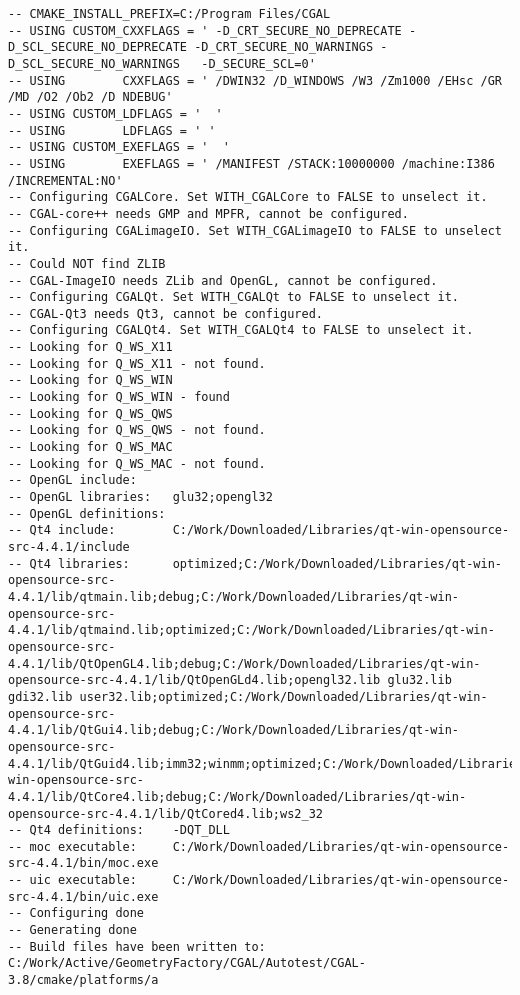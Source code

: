 {\begin{verbatim}
-- CMAKE_INSTALL_PREFIX=C:/Program Files/CGAL
-- USING CUSTOM_CXXFLAGS = ' -D_CRT_SECURE_NO_DEPRECATE -D_SCL_SECURE_NO_DEPRECATE -D_CRT_SECURE_NO_WARNINGS -D_SCL_SECURE_NO_WARNINGS   -D_SECURE_SCL=0'
-- USING        CXXFLAGS = ' /DWIN32 /D_WINDOWS /W3 /Zm1000 /EHsc /GR /MD /O2 /Ob2 /D NDEBUG'
-- USING CUSTOM_LDFLAGS = '  '
-- USING        LDFLAGS = ' '
-- USING CUSTOM_EXEFLAGS = '  '
-- USING        EXEFLAGS = ' /MANIFEST /STACK:10000000 /machine:I386 /INCREMENTAL:NO'
-- Configuring CGALCore. Set WITH_CGALCore to FALSE to unselect it.
-- CGAL-core++ needs GMP and MPFR, cannot be configured.
-- Configuring CGALimageIO. Set WITH_CGALimageIO to FALSE to unselect it.
-- Could NOT find ZLIB
-- CGAL-ImageIO needs ZLib and OpenGL, cannot be configured.
-- Configuring CGALQt. Set WITH_CGALQt to FALSE to unselect it.
-- CGAL-Qt3 needs Qt3, cannot be configured.
-- Configuring CGALQt4. Set WITH_CGALQt4 to FALSE to unselect it.
-- Looking for Q_WS_X11
-- Looking for Q_WS_X11 - not found.
-- Looking for Q_WS_WIN
-- Looking for Q_WS_WIN - found
-- Looking for Q_WS_QWS
-- Looking for Q_WS_QWS - not found.
-- Looking for Q_WS_MAC
-- Looking for Q_WS_MAC - not found.
-- OpenGL include:     
-- OpenGL libraries:   glu32;opengl32
-- OpenGL definitions: 
-- Qt4 include:        C:/Work/Downloaded/Libraries/qt-win-opensource-src-4.4.1/include
-- Qt4 libraries:      optimized;C:/Work/Downloaded/Libraries/qt-win-opensource-src-4.4.1/lib/qtmain.lib;debug;C:/Work/Downloaded/Libraries/qt-win-opensource-src-4.4.1/lib/qtmaind.lib;optimized;C:/Work/Downloaded/Libraries/qt-win-opensource-src-4.4.1/lib/QtOpenGL4.lib;debug;C:/Work/Downloaded/Libraries/qt-win-opensource-src-4.4.1/lib/QtOpenGLd4.lib;opengl32.lib glu32.lib gdi32.lib user32.lib;optimized;C:/Work/Downloaded/Libraries/qt-win-opensource-src-4.4.1/lib/QtGui4.lib;debug;C:/Work/Downloaded/Libraries/qt-win-opensource-src-4.4.1/lib/QtGuid4.lib;imm32;winmm;optimized;C:/Work/Downloaded/Libraries/qt-win-opensource-src-4.4.1/lib/QtCore4.lib;debug;C:/Work/Downloaded/Libraries/qt-win-opensource-src-4.4.1/lib/QtCored4.lib;ws2_32
-- Qt4 definitions:    -DQT_DLL
-- moc executable:     C:/Work/Downloaded/Libraries/qt-win-opensource-src-4.4.1/bin/moc.exe
-- uic executable:     C:/Work/Downloaded/Libraries/qt-win-opensource-src-4.4.1/bin/uic.exe
-- Configuring done
-- Generating done
-- Build files have been written to: C:/Work/Active/GeometryFactory/CGAL/Autotest/CGAL-3.8/cmake/platforms/a
\end{verbatim}
}




